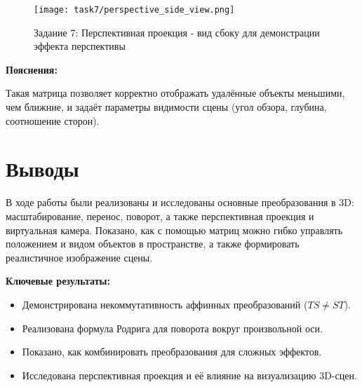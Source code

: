 \begin{figure}[h!]
    \centering
    \texttt{[image: task7/perspective\_side\_view.png]}
    \caption{Задание 7: Перспективная проекция - вид сбоку для демонстрации эффекта перспективы}
\end{figure}

\textbf{Пояснения:}

Такая матрица позволяет корректно отображать удалённые объекты меньшими, чем ближние, и задаёт параметры видимости сцены (угол обзора, глубина, соотношение сторон).

\section{Выводы}

В ходе работы были реализованы и исследованы основные преобразования в 3D: масштабирование, перенос, поворот, а также перспективная проекция и виртуальная камера. Показано, как с помощью матриц можно гибко управлять положением и видом объектов в пространстве, а также формировать реалистичное изображение сцены.

\textbf{Ключевые результаты:}
\begin{itemize}
    \item Демонстрирована некоммутативность аффинных преобразований ($TS \neq ST$).
    \item Реализована формула Родрига для поворота вокруг произвольной оси.
    \item Показано, как комбинировать преобразования для сложных эффектов.
    \item Исследована перспективная проекция и её влияние на визуализацию 3D-сцен.
\end{itemize}
